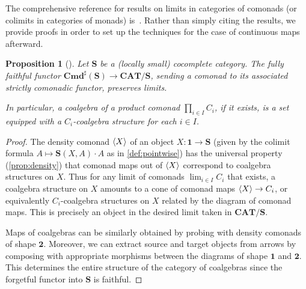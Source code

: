 \documentclass[11pt, oneside, article]{memoir}
\theoremstyle{plain}
\newtheorem{proposition}[theorem]{Proposition}
\theoremstyle{definition}
\theoremstyle{remark}
\DeclarePairedDelimiter{\gen}{\langle}{\rangle}
\newcommand{\namedcat}[1]{\mathbf{#1}}
\newcommand{\cat}[1]{\mathbf{#1}}
\newcommand{\CAT}{\namedcat{CAT}}
\newcommand{\Com}{\namedcat{Cmd}^\sharp}
\newcommand{\point}{\mathbf{1}}
\newcommand{\arro}{\mathbf{2}}
\newcommand{\compo}{\mathbf{3}}
\newcommand{\Ho}[1]{#1}
\newcommand{\cmnd}[1]{{#1}}
\newcommand{\xA}{A}
\newcommand{\xX}{X}
\newcommand{\cC}{\cmnd{C}}
\newcommand{\bS}{\cat{S}}
\begin{document}
The comprehensive reference for results on limits in categories of
comonads (or colimits in categories of monads)
is~\cite{kelly:transfinite}. Rather than simply citing the results, we
provide proofs in order to set up the techniques for the case of
continuous maps afterward.

\begin{proposition}[{\cite[Proposition 26.3]{kelly:transfinite}}]\label{prop:multicoalgebra}
  Let $\bS$ be a (locally small) cocomplete category. The fully
  faithful functor $\Com(\bS) \to \CAT/\bS$, sending a comonad to its
  associated strictly comonadic functor, preserves limits.
  
  In particular, a coalgebra of a product comonad
  $\prod_{i \in I} \cC_i$, if it exists, is a set equipped with a
  $\cC_i$-coalgebra structure for each $i \in I$.
\end{proposition}
\begin{proof}
  The density comonad $\gen{\xX}$ of an object
  $\xX \colon \point \to \bS$ (given by the colimit formula
  $\xA \mapsto \Ho{\bS}(\xX, \xA)\cdot \xA$ as in
  \cref{def:pointwise}) has the universal property
  (\cref{prop:density}) that comonad maps out of $\gen{\xX}$
  correspond to coalgebra structures on $\xX$. Thus for any limit of
  comonads $\lim_{i \in I} \cC_i$ that exists, a coalgebra structure
  on $\xX$ amounts to a cone of comonad maps $\gen{\xX} \to \cC_i$, or
  equivalently $\cC_i$-coalgebra structures on $\xX$ related by the
  diagram of comonad maps. This is precisely an object in the desired
  limit taken in $\CAT/\bS$.
  
  
  Maps of coalgebras can be similarly obtained by probing with density
  comonads of shape $\arro$. Moreover, we can extract source and
  target objects from arrows by composing with appropriate morphisms
  between the diagrams of shape $\point$ and $\arro$. This determines
  the entire structure of the category of coalgebras since the
  forgetful functor into $\bS$ is faithful.
\end{proof}
\end{document}
